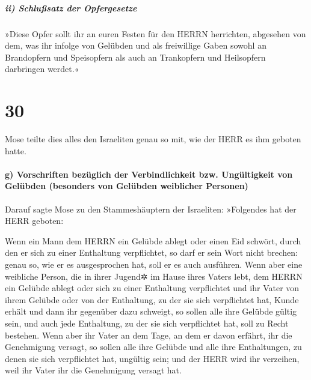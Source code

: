 \hypertarget{ii-schluuxdfsatz-der-opfergesetze}{%
\subparagraph{ii) Schlußsatz der
Opfergesetze}\label{ii-schluuxdfsatz-der-opfergesetze}}

»Diese Opfer sollt ihr an euren Festen für den HERRN
herrichten, abgesehen von dem, was ihr infolge von Gelübden und als
freiwillige Gaben sowohl an Brandopfern und Speisopfern als auch an
Trankopfern und Heilsopfern darbringen werdet.«

\hypertarget{section-29}{%
\section{30}\label{section-29}}

Mose teilte dies alles den Israeliten genau so mit, wie
der HERR es ihm geboten hatte.

\hypertarget{g-vorschriften-bezuxfcglich-der-verbindlichkeit-bzw.-unguxfcltigkeit-von-geluxfcbden-besonders-von-geluxfcbden-weiblicher-personen}{%
\paragraph{g) Vorschriften bezüglich der Verbindlichkeit bzw.
Ungültigkeit von Gelübden (besonders von Gelübden weiblicher
Personen)}\label{g-vorschriften-bezuxfcglich-der-verbindlichkeit-bzw.-unguxfcltigkeit-von-geluxfcbden-besonders-von-geluxfcbden-weiblicher-personen}}

Darauf sagte Mose zu den Stammeshäuptern der Israeliten:
»Folgendes hat der HERR geboten:

Wenn ein Mann dem HERRN ein Gelübde ablegt oder einen Eid
schwört, durch den er sich zu einer Enthaltung verpflichtet, so darf er
sein Wort nicht brechen: genau so, wie er es ausgesprochen hat, soll er
es auch ausführen. Wenn aber eine weibliche Person, die in
ihrer Jugend✲ im Hause ihres Vaters lebt, dem HERRN ein Gelübde ablegt
oder sich zu einer Enthaltung verpflichtet und ihr Vater
von ihrem Gelübde oder von der Enthaltung, zu der sie sich verpflichtet
hat, Kunde erhält und dann ihr gegenüber dazu schweigt, so sollen alle
ihre Gelübde gültig sein, und auch jede Enthaltung, zu der sie sich
verpflichtet hat, soll zu Recht bestehen. Wenn aber ihr
Vater an dem Tage, an dem er davon erfährt, ihr die Genehmigung versagt,
so sollen alle ihre Gelübde und alle ihre Enthaltungen, zu denen sie
sich verpflichtet hat, ungültig sein; und der HERR wird ihr verzeihen,
weil ihr Vater ihr die Genehmigung versagt hat.

